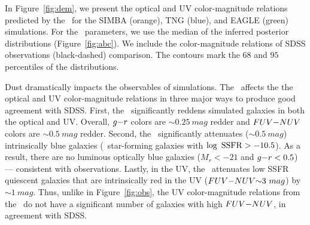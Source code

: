 In Figure~\ref{fig:dem}, we present the optical and UV color-magnitude
relations predicted by the 
\eda~for the SIMBA (orange), TNG (blue), and EAGLE (green) simulations. 
For the \eda~parameters, we use the median of the inferred posterior distributions (Figure~\ref{fig:abc}). 
We include the color-magnitude
relations of SDSS observations (black-dashed) comparison. The contours mark 
the $68$ and $95$ percentiles of the distributions. 

Dust dramatically impacts the observables of simulations. The \eda~affects the 
the optical and UV color-magnitude relations in three major ways to produce
good agreement with SDSS. 
First, the \eda~significantly reddens simulated galaxies in both the optical
and UV. Overall, $g{-}r$ colors are ${\sim}0.25~mag$ redder and $FUV{-}NUV$ colors
are ${\sim}0.5~mag$ redder. 
Second, the \eda~significantly attenuates (${\sim}0.5~mag$) intrinsically blue
galaxies (\ie~star-forming galaxies with $\log~{\rm SSFR} > -10.5$). As a
result, there are no luminous optically blue galaxies ($M_r < -21$ and $g{-}r <
0.5$) --- consistent with observations.
Lastly, in the UV, the \eda~attenuates low SSFR quiescent galaxies that are 
intrinsically red in the UV ($FUV{-}NUV{\sim}3~mag$) by ${\sim}1~mag$. Thus, unlike in
Figure~\ref{fig:obs}, the UV color-magnitude relations from the \eda~do not
have a significant number of galaxies with high $FUV{-}NUV$, in agreement with SDSS.

